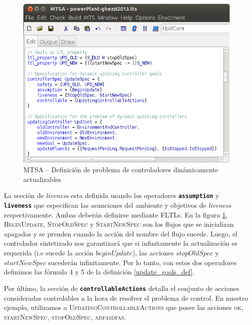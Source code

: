 \begin{figure}
    \centering
    \includegraphics[scale=0.5]{img/MTSA_example.png}
    \caption{MTSA -- Definición de problema de controladores dinámicamente actualizables}
    \label{MTSA_example}
\end{figure}

La sección de \emph{liveness} esta definida usando los operadores \texttt{\textbf{assumption}} y
\texttt{\textbf{liveness}} que especifican las asunciones del ambiente y objetivos de \emph{liveness} respectivamente.
Ambas deberán definirse mediante FLTLs. En la figura \ref{MTSA_example}, \textsc{BeginUpdate}, \textsc{StopOldSpec} y
\textsc{StartNewSpec} son los flujos que se inicializan apagados y se prenden cuando la acción del nombre del flujo
sucede. Luego, el controlador sintetizado nos garantizará que si infinitamente la actualización es requerida (i.e sucede
la acción $beginUpdate$), las acciones $stopOldSpec$ y $startNewSpec$ sucederán infinitamente. Por lo tanto, con estos
dos operadores definimos las fórmula 4 y 5 de la definición \ref{update_goals_def}.

Por último, la sección de \texttt{\textbf{controllableActions}} detalla el conjunto de acciones consideradas
controlables a la hora de resolver el problema de control. En nuestro ejemplo, utilizamos a
\textsc{UpdatingControllableActions} que posee las acciones \textsc{ok}, \textsc{startNewSpec}, \textsc{stopOldSpec},
\textsc{adfasdfas}.




